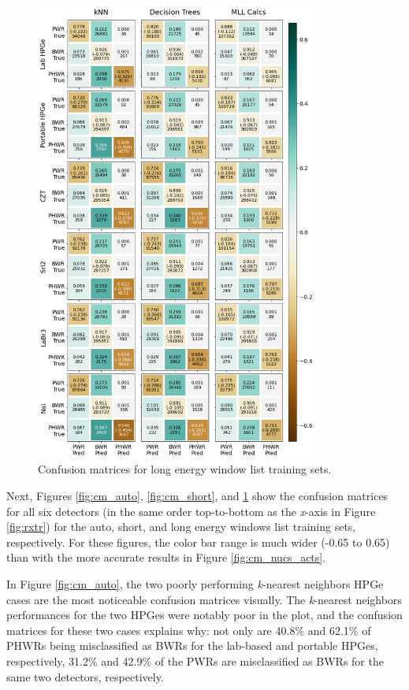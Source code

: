 \begin{figure}[!htbp]
  \centering
  \includegraphics[width=0.83\textwidth]{./chapters/exp2/confusion_matrix_6dets_long.png}
  \caption[Confusion matrices for long energy window list training sets.]
          {Confusion matrices for long energy window list training sets.}
  \label{fig:cm_long}
\end{figure}

Next, Figures \ref{fig:cm_auto}, \ref{fig:cm_short}, and \ref{fig:cm_long} show
the confusion matrices for all six detectors (in the same order top-to-bottom
as the \textit{x}-axis in Figure \ref{fig:rxtr}) for the auto, short, and long
energy windows list training sets, respectively. For these figures, the color
bar range is much wider (-0.65 to 0.65) than with the more accurate results in
Figure \ref{fig:cm_nucs_acts}. 

In Figure \ref{fig:cm_auto}, the two poorly performing \textit{k}-nearest
neighbors \gls{HPGe} cases are the most noticeable confusion matrices visually.
The \textit{k}-nearest neighbors performances for the two \gls{HPGe}s were
notably poor in the plot, and the confusion matrices for these two cases
explains why: not only are 40.8\% and 62.1\% of \gls{PHWR}s being misclassified
as \gls{BWR}s for the lab-based and portable \gls{HPGe}s, respectively, 31.2\%
and 42.9\% of the \gls{PWR}s are misclassified as \gls{BWR}s for the same two
detectors, respectively.

